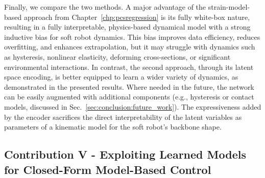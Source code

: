 Finally, we compare the two methods. A major advantage of the strain-model-based approach from Chapter~\ref{chp:pcsregression} is its fully white-box nature, resulting in a fully interpretable, physics-based dynamical model with a strong inductive bias for soft robot dynamics. This bias improves data efficiency, reduces overfitting, and enhances extrapolation, but it may struggle with dynamics such as hysteresis, nonlinear elasticity, deforming cross-sections, or significant environmental interactions. In contrast, the second approach, through its latent space encoding, is better equipped to learn a wider variety of dynamics, as demonstrated in the presented results. Where needed in the future, the network can be easily augmented with additional components (e.g., hysteresis or contact models, discussed in Sec.~\ref{sec:conclusion:future_work}). The expressiveness added by the encoder sacrifices the direct interpretability of the latent variables as parameters of a kinematic model for the soft robot’s backbone shape.

\subsection{Contribution V - Exploiting Learned Models for Closed-Form Model-Based Control}


